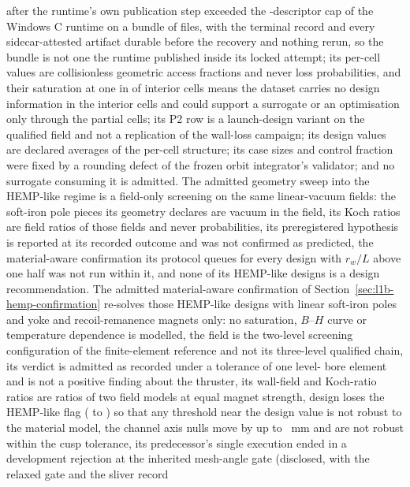\documentclass[11pt]{article}
\begin{document}
after the runtime's own publication step exceeded the \WlhDescriptorCap-descriptor
cap of the Windows C runtime on a bundle of \WlhDisclosedFileCount{} files, with
the terminal record and every sidecar-attested artifact durable before the
recovery and nothing rerun, so the bundle is not one the runtime published inside
its locked attempt; its per-cell values are collisionless geometric access
fractions and never loss probabilities, and their saturation at one in
\WlhInteriorAtOne{} of \WlhInteriorCells{} interior cells means the dataset carries
no design information in the interior cells and could support a surrogate or an
optimisation only through the partial cells; its P2 row is a launch-design
variant on the qualified field and not a replication of the wall-loss campaign;
its design values are declared averages of the per-cell structure; its case sizes
and control fraction were fixed by a rounding defect of the frozen orbit
integrator's validator; and no surrogate consuming it is admitted. The admitted geometry sweep into the HEMP-like regime is a field-only
screening on the same linear-vacuum fields: the soft-iron pole pieces its
geometry declares are vacuum in the field, its Koch ratios are field ratios of
those fields and never probabilities, its preregistered hypothesis is reported at
its recorded outcome and was not confirmed as predicted, the material-aware
confirmation its protocol queues for every design with $r_w/L$ above one half was
not run within it, and none of its HEMP-like designs is a design recommendation.
The admitted material-aware confirmation of Section~\ref{sec:l1b-hemp-confirmation}
re-solves those HEMP-like designs with linear soft-iron poles and yoke and
recoil-remanence magnets only: no saturation, $B$--$H$ curve or temperature
dependence is modelled, the field is the two-level screening configuration of the
finite-element reference and not its three-level qualified chain, its verdict
\texttt{\HmcVerdict} is admitted as recorded under a tolerance of one
level-\HmcLevelZeroToken{} bore element and is not a positive finding about the
thruster, its wall-field and Koch-ratio ratios are ratios of two field models at
equal magnet strength, design \texttt{\HmcLostDesign} loses the HEMP-like flag
(\HmcLostDesignLOneARho{} to \HmcLostDesignPTwoRho) so that any threshold near the
design value is not robust to the material model, the channel axis nulls move by
up to \HmcChannelNullShiftMaxMm~mm and are not robust within the cusp tolerance,
its predecessor's single execution ended in a development rejection at the
inherited mesh-angle gate (disclosed, with the relaxed gate and the sliver record
\end{document}
